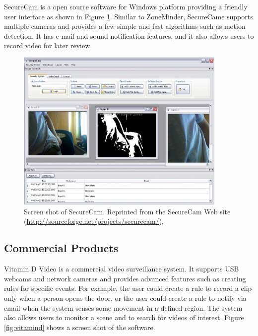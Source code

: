 SecureCam  is a open source software for
Windows platform providing a friendly user interface as shown in
Figure \ref{fig:securecam}. Similar to ZoneMinder, SecureCame supports
multiple cameras and provides a few simple and fast algorithms such as
motion detection. It has e-mail and sound notification features, and
it also allows users to record video for later review.

\begin{figure}[t]
  \begin{center}
    \includegraphics[width=4in]{figures/securecam.jpg}
    \caption[Screen shot of SecureCam.]{\small Screen shot of
      SecureCam. Reprinted from the SecureCam Web site
      (\url{http://sourceforge.net/projects/securecam/}).}
    \label{fig:securecam}
  \end{center}
\end{figure}

\subsection{Commercial Products}

Vitamin D Video  is a commercial video
surveillance system. It supports USB webcams and network cameras and
provides advanced features such as creating rules for specific events.
For example, the user could create a rule to record a clip only when a
person opens the door, or the user could create a rule to notify via
email when the system senses some movement in a defined region. The
system also allows users to monitor a scene and to search for videos
of interest.  Figure \ref{fig:vitamind} shows a screen shot of the
software.


